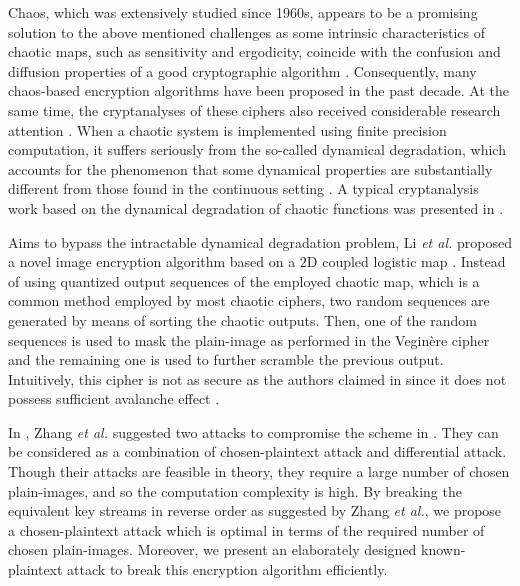 \documentclass[smallextended, final]{svjour3}          \smartqed
\begin{document}
Chaos, which was extensively studied since 1960s, appears to be a promising solution to the above mentioned challenges as
some intrinsic characteristics of chaotic maps, such as sensitivity and ergodicity,
coincide with the confusion and diffusion properties of a good cryptographic algorithm \cite{Shannon:Communication:Bell49}.
Consequently, many chaos-based encryption algorithms \cite{fridrich1998symmetric, chen2004symmetric, jakimoski2001chaos,
mao2004novel, behnia2008novel, riad2012new} have been proposed in the past decade.
At the same time, the cryptanalyses of these ciphers also received considerable research attention
\cite{alvarez2004cryptanalysis, chen2006chosen, solak2010cryptanalysis, li2012breaking, li2009improving, zhangcryptanalyzing}.
When a chaotic system is implemented using finite precision computation, it suffers seriously from the so-called dynamical degradation,
which accounts for the phenomenon that some dynamical properties are substantially different from those found in the continuous setting \cite{li2005dynamical}.
A typical cryptanalysis work based on the dynamical degradation of chaotic functions was presented in \cite{li2003security}.





Aims to bypass the intractable dynamical degradation problem, Li \textit{et al.} proposed a novel image encryption algorithm based on a
$2$D coupled logistic map \cite{li2012image}. Instead of using quantized output sequences of the employed chaotic map, which is a common method employed by
most chaotic ciphers, two random sequences are generated by means of sorting the chaotic outputs. Then, one of the random sequences is
used to mask the plain-image as performed in the Vegin{\`e}re cipher and the remaining one is used to further scramble the previous output.
Intuitively, this cipher is not as secure as the authors claimed in \cite[Sec.~3]{li2012image} since it does not possess sufficient
avalanche effect \cite{Wade:IntroCypt:Prentice2002}.


In \cite{zhang2014cryptanalysis}, Zhang \textit{et al.} suggested two attacks to compromise the scheme in \cite{li2012image}.
They can be considered as a combination of chosen-plaintext attack and differential attack.
Though their attacks are feasible in theory, they require a large number of
chosen plain-images, and so the computation complexity is high. By breaking the equivalent key streams in reverse order as suggested by Zhang
\textit{et al.}, we propose a chosen-plaintext attack which is optimal in terms of the required number of chosen plain-images.
Moreover, we present an elaborately designed known-plaintext attack to break this encryption algorithm efficiently.
\end{document}
